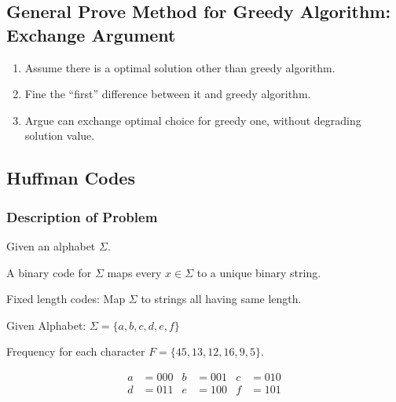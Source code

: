 \subsection{General Prove Method for Greedy Algorithm: Exchange Argument}
\begin{enumerate}
    \item Assume there is a optimal solution other than greedy algorithm.
    \item Fine the ``first'' difference between it and greedy algorithm.
    \item Argue can exchange optimal choice for greedy one, without degrading solution value.
\end{enumerate}

\subsection{Huffman Codes}
\subsubsection{Description of Problem}
\AlgoInput Given an alphabet $\Sigma$.

\AlgoOutput A binary code for $\Sigma$ maps
every $x \in \Sigma$ to a unique binary string.


\AlgoExample
Fixed length codes: Map $\Sigma$ to strings all having same length.

Given Alphabet: $\Sigma = \{a, b, c, d, e, f\}$

Frequency for each character $F = \{45, 13, 12, 16, 9, 5\}$.

\begin{align*}
    a &= 000 & b &= 001 & c &= 010 \\
    d &= 011 & e &= 100 & f &= 101
\end{align*}

